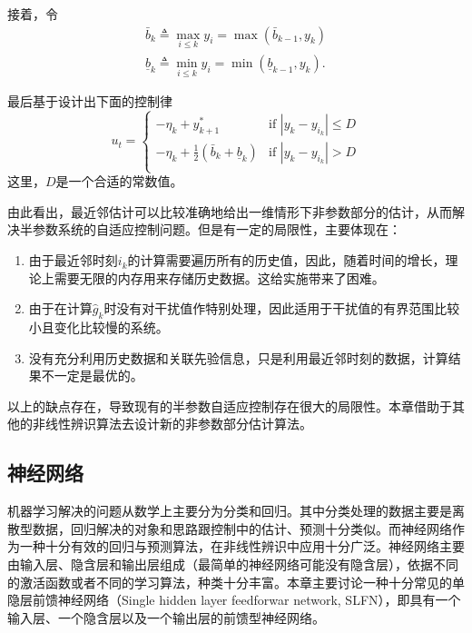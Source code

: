 接着，令
\begin{equation}\label{eq.4:bk}
\begin{array}{lll}
\bar{b}_k\triangleq \max\limits_{i\leq k}y_i
         =\max(\bar{b}_{k-1}, y_k)\\
\underline{b}_k\triangleq \min\limits_{i\leq k}{y_i}
                =\min(\underline{b}_{k-1}, y_k).
\end{array} 
\end{equation}

最后基于设计出下面的控制律
\begin{equation}\label{eq:4.uk}
u_{t}=\left\{
\begin{array}{cc}
  -\hat \eta_k+y_{k+1}^* & \text{if } |y_k-y_{i_k}|\le D \\
  -\hat \eta_k+\frac12(\bar b_k+\underline b_k) & \text{if } |y_k-y_{i_k}|> D \\
\end{array}
\right.
\end{equation}
这里，$D$是一个合适的常数值。

由此看出，最近邻估计可以比较准确地给出一维情形下非参数部分的估计，从而解决半参数系统的自适应控制问题。但是有一定的局限性，主要体现在：
\begin{enumerate}
\item 由于最近邻时刻$i_k$的计算需要遍历所有的历史值，因此，随着时间的增长，理论上需要无限的内存用来存储历史数据。这给实施带来了困难。
\item 由于在计算$\hat{g}_k$时没有对干扰值作特别处理，因此适用于干扰值的有界范围比较小且变化比较慢的系统。
\item 没有充分利用历史数据和关联先验信息，只是利用最近邻时刻的数据，计算结果不一定是最优的。
\end{enumerate}

以上的缺点存在，导致现有的半参数自适应控制存在很大的局限性。本章借助于其他的非线性辨识算法去设计新的非参数部分估计算法。

\subsection{神经网络}
机器学习解决的问题从数学上主要分为分类和回归。其中分类处理的数据主要是离散型数据，回归解决的对象和思路跟控制中的估计、预测十分类似。而神经网络作为一种十分有效的回归与预测算法，在非线性辨识中应用十分广泛。神经网络主要由输入层、隐含层和输出层组成（最简单的神经网络可能没有隐含层），依据不同的激活函数或者不同的学习算法，种类十分丰富。本章主要讨论一种十分常见的单隐层前馈神经网络（Single hidden layer feedforwar network, SLFN），即具有一个输入层、一个隐含层以及一个输出层的前馈型神经网络。

